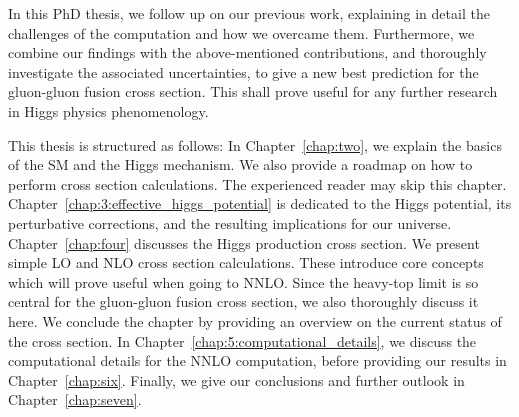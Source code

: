 In this PhD thesis, we follow up on our previous work, explaining in detail the challenges of the computation and how we overcame them. Furthermore, we combine our findings with the above-mentioned contributions, and thoroughly investigate the associated uncertainties, to give a new best prediction for the gluon-gluon fusion cross section. This shall prove useful for any further research in Higgs physics phenomenology.

This thesis is structured as follows: In Chapter~\ref{chap:two}, we explain the basics of the \acs{SM} and the Higgs mechanism. We also provide a roadmap on how to perform cross section calculations. The experienced reader may skip this chapter. Chapter~\ref{chap:3:effective_higgs_potential} is dedicated to the Higgs potential, its perturbative corrections, and the resulting implications for our universe. Chapter~\ref{chap:four} discusses the Higgs production cross section. We present simple \acs{LO} and \acs{NLO} cross section calculations. These introduce core concepts which will prove useful when going to \acs{NNLO}. Since the heavy-top limit is so central for the gluon-gluon fusion cross section, we also thoroughly discuss it here. We conclude the chapter by providing an overview on the current status of the cross section. In Chapter~\ref{chap:5:computational_details}, we discuss the computational details for the \acs{NNLO} computation, before providing our results in Chapter~\ref{chap:six}. Finally, we give our conclusions and further outlook in Chapter~\ref{chap:seven}.
